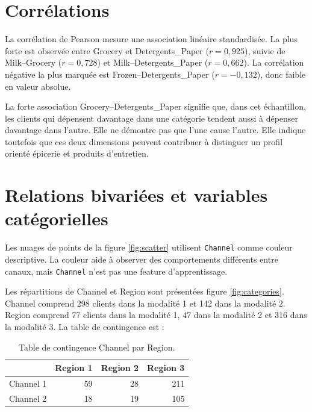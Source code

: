 \section{Corrélations}
La corrélation de Pearson mesure une association linéaire standardisée. La plus forte est observée entre Grocery et Detergents\_Paper ($r=0,925$), suivie de Milk--Grocery ($r=0,728$) et Milk--Detergents\_Paper ($r=0,662$). La corrélation négative la plus marquée est Frozen--Detergents\_Paper ($r=-0,132$), donc faible en valeur absolue.


La forte association Grocery--Detergents\_Paper signifie que, dans cet échantillon, les clients qui dépensent davantage dans une catégorie tendent aussi à dépenser davantage dans l'autre. Elle ne démontre pas que l'une cause l'autre. Elle indique toutefois que ces deux dimensions peuvent contribuer à distinguer un profil orienté épicerie et produits d'entretien.

\section{Relations bivariées et variables catégorielles}
Les nuages de points de la figure \ref{fig:scatter} utilisent \texttt{Channel} comme couleur descriptive. La couleur aide à observer des comportements différents entre canaux, mais \texttt{Channel} n'est pas une feature d'apprentissage.


Les répartitions de Channel et Region sont présentées figure \ref{fig:categories}. Channel comprend 298 clients dans la modalité 1 et 142 dans la modalité 2. Region comprend 77 clients dans la modalité 1, 47 dans la modalité 2 et 316 dans la modalité 3. La table de contingence est :
\begin{table}[H]
\centering
\caption{Table de contingence Channel par Region.}
\label{tab:contingence}
\begin{tabular}{lrrr}
\toprule
 & Region 1 & Region 2 & Region 3 \\
\midrule
Channel 1 & 59 & 28 & 211 \\
Channel 2 & 18 & 19 & 105 \\
\bottomrule
\end{tabular}
\end{table}

